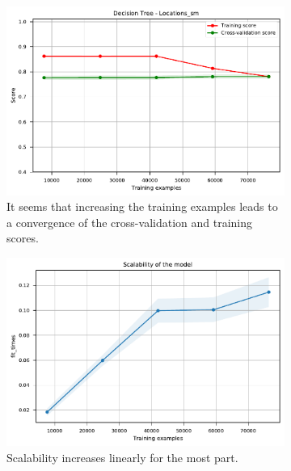 \documentclass{l4proj}
\begin{document}
\begin{appendices}
\begin{figure}[htbp]
    \centering
    \begin{subfigure}[b]{0.70\textwidth}
        \includegraphics[width=\textwidth]{images/location/learning_curve_1_DecisionTreeLocations_sm.pdf}
        \caption{It seems that increasing the training examples leads to a convergence of the cross-validation and training scores.}
        \label{fig:learning_curve_1_DecisionTreeLocations_sm}
    \end{subfigure}
    \begin{subfigure}[b]{0.70\textwidth}
        \includegraphics[width=\textwidth]{images/location/learning_curve_2_DecisionTreeLocations_sm.pdf}
        \caption{Scalability increases linearly for the most part.}
        \label{fig:learning_curve_2_DecisionTreeLocations_sm}
    \end{subfigure}
    \begin{subfigure}[b]{0.70\textwidth}

\end{subfigure}
\end{figure}
\end{appendices}
\end{document}
